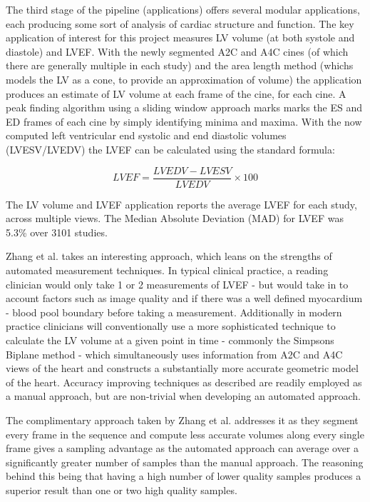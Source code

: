 The third stage of the pipeline (applications) offers several modular
applications, each producing some sort of analysis of cardiac structure and
function. The key application of interest for this project measures LV volume
(at both systole and diastole) and LVEF. With the newly segmented A2C and A4C
cines (of which there are generally multiple in each study) and the area length
method (whichs models the LV as a cone, to provide an approximation of volume)
the application produces an estimate of LV volume at each frame of the cine, for
each cine. A peak finding algorithm using a sliding window approach marks marks
the ES and ED frames of each cine by simply identifying minima and maxima. With
the now computed left ventricular end systolic and end diastolic volumes
(LVESV/LVEDV) the LVEF can be calculated using the standard formula: \newline

\begin{equation}
        LVEF = \frac{LVEDV - LVESV}{LVEDV} \times 100
\end{equation} \newline

The LV volume and LVEF application reports the average LVEF for each study,
across multiple views. The Median Absolute Deviation (MAD) for LVEF was
5.3\% over 3101 studies. \newline

Zhang et al. takes an interesting approach, which leans on the strengths of
automated measurement techniques. In typical clinical practice, a reading
clinician would only take 1 or 2 measurements of LVEF - but would take in to
account factors such as image quality and if there was a well defined myocardium
- blood pool boundary before taking a measurement. Additionally in modern
practice clinicians will conventionally use a more sophisticated technique to
calculate the LV volume at a given point in time - commonly the Simpsons Biplane
method - which simultaneously uses information from A2C and A4C views of the
heart and constructs a substantially more accurate geometric model of the heart.
Accuracy improving techniques as described are readily employed as a manual
approach, but are non-trivial when developing an automated approach. \newline

The complimentary approach taken by Zhang et al. addresses it as they segment
every frame in the sequence and compute less accurate volumes along every single
frame gives a sampling advantage as the automated approach can average over a
significantly greater number of samples than the manual approach. The reasoning
behind this being that having a high number of lower quality samples produces a
superior result than one or two high quality samples. \newline

